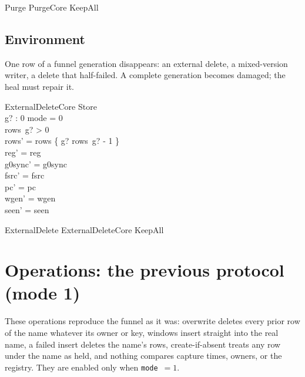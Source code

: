 \documentclass[a4paper,10pt,fleqn]{article}
\newcommand{\field}[1]{\texttt{#1}}
\begin{document}
\begin{zed}
Purge  PurgeCore \land KeepAll
\end{zed}

\subsection{Environment}

One row of a funnel generation disappears: an external delete, a mixed-version
writer, a delete that half-failed. A complete generation becomes damaged; the
heal must repair it.

\begin{schema}{ExternalDeleteCore}
\Delta Store \\ g? : 0 
\where
mode = 0 \\
rows~g? > 0 \\
rows' = rows \oplus \{ g? \mapsto rows~g? - 1 \} \\
reg' = reg \\
g0sync' = g0sync \\
fsrc' = fsrc \\
pc' = pc \\
wgen' = wgen \\
seen' = seen
\end{schema}

\begin{zed}
ExternalDelete  ExternalDeleteCore \land KeepAll
\end{zed}

\section{Operations: the previous protocol (mode 1)}
\label{sec:old}

These operations reproduce the funnel as it was: overwrite deletes every
prior row of the name whatever its owner or key, windows insert straight into
the real name, a failed insert deletes the name's rows, create-if-absent
treats any row under the name as held, and nothing compares capture times,
owners, or the registry. They are enabled only when \field{mode}~$=1$.
\end{document}
